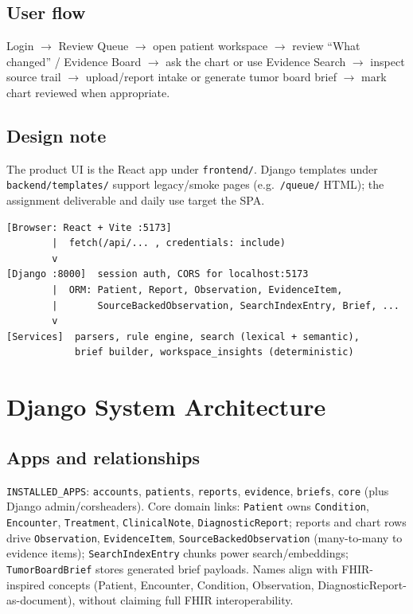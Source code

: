 \documentclass[11pt]{article}
\begin{document}
\subsection{User flow}
Login $\rightarrow$ Review Queue $\rightarrow$ open patient workspace $\rightarrow$ review ``What changed'' / Evidence Board $\rightarrow$ ask the chart or use Evidence Search $\rightarrow$ inspect source trail $\rightarrow$ upload/report intake or generate tumor board brief $\rightarrow$ mark chart reviewed when appropriate.

\subsection{Design note}
The product UI is the React app under \texttt{frontend/}. Django templates under \texttt{backend/templates/} support legacy/smoke pages (e.g.\ \texttt{/queue/} HTML); the assignment deliverable and daily use target the SPA.

\begin{verbatim}
[Browser: React + Vite :5173]
        |  fetch(/api/... , credentials: include)
        v
[Django :8000]  session auth, CORS for localhost:5173
        |  ORM: Patient, Report, Observation, EvidenceItem,
        |       SourceBackedObservation, SearchIndexEntry, Brief, ...
        v
[Services]  parsers, rule engine, search (lexical + semantic),
            brief builder, workspace_insights (deterministic)
\end{verbatim}

\section{Django System Architecture}

\subsection{Apps and relationships}
\texttt{INSTALLED\_APPS}: \texttt{accounts}, \texttt{patients}, \texttt{reports}, \texttt{evidence}, \texttt{briefs}, \texttt{core} (plus Django admin/corsheaders). Core domain links:
\texttt{Patient} owns \texttt{Condition}, \texttt{Encounter}, \texttt{Treatment}, \texttt{ClinicalNote}, \texttt{DiagnosticReport}; reports and chart rows drive \texttt{Observation}, \texttt{EvidenceItem}, \texttt{SourceBackedObservation} (many-to-many to evidence items); \texttt{SearchIndexEntry} chunks power search/embeddings; \texttt{TumorBoardBrief} stores generated brief payloads. Names align with FHIR-inspired concepts (Patient, Encounter, Condition, Observation, DiagnosticReport-as-document), without claiming full FHIR interoperability.
\end{document}
